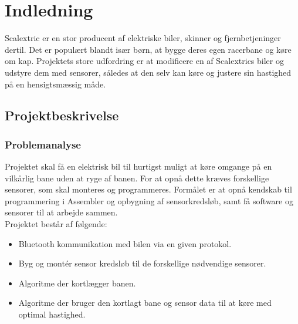 \newpage

\tableofcontents



\newpage
\section{Indledning}
Scalextric er en stor producent af elektriske biler, skinner og fjernbetjeninger dertil. Det er populært blandt især børn, at bygge deres egen racerbane og køre om kap. Projektets store udfordring er at modificere en af Scalextrics biler og udstyre dem med sensorer, således at den selv kan køre og justere sin hastighed på en hensigtsmæssig måde.

\subsection{Projektbeskrivelse}
\subsubsection{Problemanalyse}
\label{problemanalyse}
Projektet skal få en elektrisk bil til hurtigst muligt at køre omgange på en vilkårlig bane uden at ryge af banen. For at opnå dette kræves forskellige sensorer, som skal monteres og programmeres. Formålet er at opnå kendskab til programmering i Assembler og opbygning af sensorkredsløb, samt få software og sensorer til at arbejde sammen.  \\
Projektet består af følgende: \\

\begin{itemize}
\item Bluetooth kommunikation med bilen via en given protokol.
\item Byg og montér sensor kredsløb til de forskellige nødvendige sensorer.
\item Algoritme der kortlægger banen.
\item Algoritme der bruger den kortlagt bane og sensor data til at køre med optimal hastighed.
\end{itemize}


